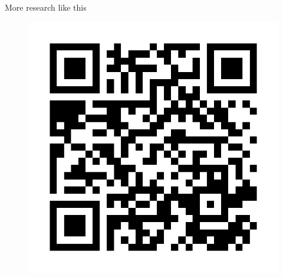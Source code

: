 \documentclass{beamer}\usepackage[]{graphicx}\usepackage[]{xcolor}
\makeatletter
\def\maxwidth{ %
  \ifdim\Gin@nat@width>\linewidth
    \linewidth
  \else
    \Gin@nat@width
  \fi
}
\newenvironment{knitrout}{}{} %
\makeatother
\begin{document}
\begin{frame}[fragile]
\begin{columns}
\begin{column}{.28\textwidth}
\begin{block}{\centering More research like this}
\begin{figure}
\begin{knitrout}
{\centering \includegraphics[width=\maxwidth]{figure/QR-code-research-1} 

}


\end{knitrout}
      \end{figure}
    \end{block}
  \end{column}

  \end{columns}  

  \bigskip
  {\hrulefill}
  \bigskip


\end{frame}
\end{document}
